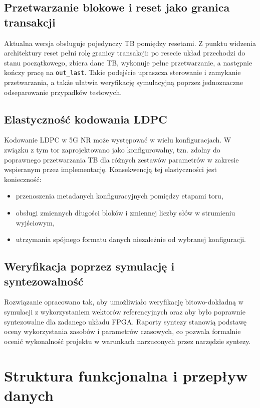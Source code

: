 \subsection{Przetwarzanie blokowe i reset jako granica transakcji}
Aktualna wersja obsługuje pojedynczy TB pomiędzy resetami. Z punktu widzenia architektury reset pełni rolę granicy transakcji: po resecie układ przechodzi do stanu początkowego, zbiera dane TB, wykonuje pełne przetwarzanie, a następnie kończy pracę na \texttt{out\_last}. Takie podejście upraszcza sterowanie i zamykanie przetwarzania, a także ułatwia weryfikację symulacyjną poprzez jednoznaczne odseparowanie przypadków testowych.

\subsection{Elastyczność kodowania LDPC}
Kodowanie LDPC w 5G NR może występować w wielu konfiguracjach. W związku z tym tor zaprojektowano jako konfigurowalny, tzn. zdolny do poprawnego przetwarzania TB dla różnych zestawów parametrów w zakresie wspieranym przez implementację. Konsekwencją tej elastyczności jest konieczność:
\begin{itemize}
    \item przenoszenia metadanych konfiguracyjnych pomiędzy etapami toru,
    \item obsługi zmiennych długości bloków i zmiennej liczby słów w strumieniu wyjściowym,
    \item utrzymania spójnego formatu danych niezależnie od wybranej konfiguracji.
\end{itemize}

\subsection{Weryfikacja poprzez symulację i syntezowalność}
Rozwiązanie opracowano tak, aby umożliwiało weryfikację bitowo-dokładną w symulacji z wykorzystaniem wektorów referencyjnych oraz aby było poprawnie syntezowalne dla zadanego układu FPGA. Raporty syntezy stanowią podstawę oceny wykorzystania zasobów i parametrów czasowych, co pozwala formalnie ocenić wykonalność projektu w warunkach narzuconych przez narzędzie syntezy.


\section{Struktura funkcjonalna i przepływ danych}
\label{sec:struktura_i_przeplyw}

